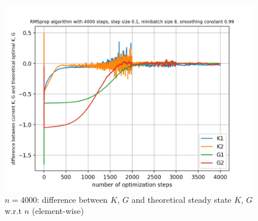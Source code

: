 \documentclass{article}
\begin{document}
\begin{figure}[h!]
\begin{minipage}[t]{.27\paperwidth}
		\centering
		\includegraphics[width=1.0\textwidth]{Figures/diff_4000_sep.png}
		\caption{$n=4000$: difference between $K$, $G$ and theoretical steady state $K$, $G$ w.r.t $n$ (element-wise)\label{fig:diff_4000_sep}}
	\end{minipage}
\end{figure}
\end{document}
